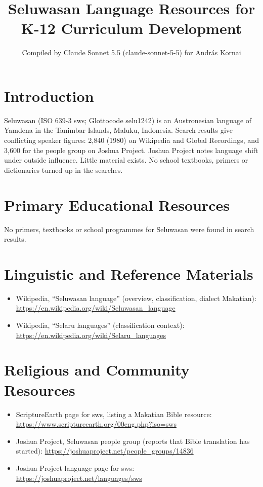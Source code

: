 \documentclass[12pt]{article}
\title{Seluwasan Language Resources for K-12 Curriculum Development}
\author{Compiled by Claude Sonnet 5.5 (claude-sonnet-5-5) for Andr\'as Kornai}
\date{}
\begin{document}
\maketitle

\section{Introduction}
Seluwasan (ISO 639-3 sws; Glottocode selu1242) is an Austronesian language of Yamdena in the Tanimbar Islands, Maluku, Indonesia. Search results give conflicting speaker figures: 2,840 (1980) on Wikipedia and Global Recordings, and 3,600 for the people group on Joshua Project. Joshua Project notes language shift under outside influence. Little material exists. No school textbooks, primers or dictionaries turned up in the searches.

\section{Primary Educational Resources}
No primers, textbooks or school programmes for Seluwasan were found in search results.

\section{Linguistic and Reference Materials}
\begin{itemize}
\item Wikipedia, ``Seluwasan language'' (overview, classification, dialect Makatian): \url{https://en.wikipedia.org/wiki/Seluwasan_language}
\item Wikipedia, ``Selaru languages'' (classification context): \url{https://en.wikipedia.org/wiki/Selaru_languages}
\end{itemize}

\section{Religious and Community Resources}
\begin{itemize}
\item ScriptureEarth page for sws, listing a Makatian Bible resource: \url{https://www.scriptureearth.org/00eng.php?iso=sws}
\item Joshua Project, Seluwasan people group (reports that Bible translation has started): \url{https://joshuaproject.net/people_groups/14836}
\item Joshua Project language page for sws: \url{https://joshuaproject.net/languages/sws}
\end{itemize}
\end{document}
